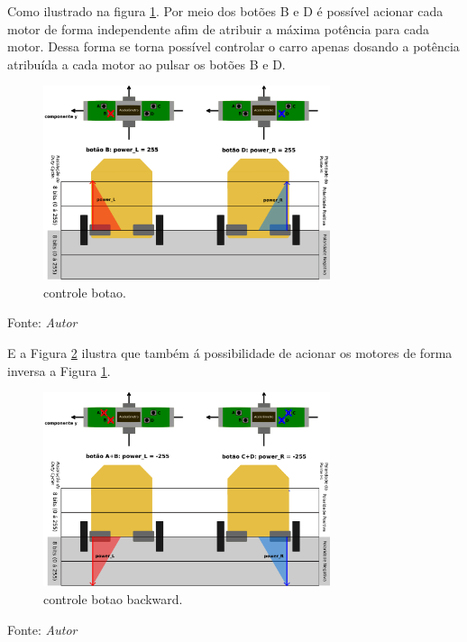 \pagebreak

Como ilustrado na figura \ref{fig:controle_botao_up}.
Por meio dos botões B e D é possível acionar cada motor de forma independente afim de atribuir a máxima potência para cada motor. 
Dessa forma se torna possível controlar o carro apenas dosando a potência atribuída a cada motor ao pulsar os botões B e D.

\begin{figure}[!htb]
  \centering
  \caption{controle botao.}
  \label{fig:controle_botao_up}
  \includegraphics[width=0.75\textwidth]{./img/projeto/controle_botao_up.png}
\end{figure}
Fonte: \textit{Autor}

E a Figura \ref{fig:controle_botao_backward} ilustra que também á possibilidade de acionar os motores de forma inversa a Figura \ref{fig:controle_botao_up}.

\begin{figure}[!htb]
  \centering
  \caption{controle botao backward.}
  \label{fig:controle_botao_backward}
  \includegraphics[width=0.75\textwidth]{./img/projeto/controle_botao_backward.png}
\end{figure}
Fonte: \textit{Autor}

\pagebreak

